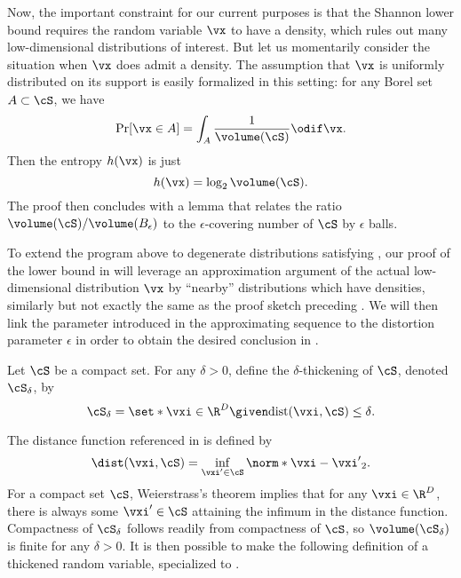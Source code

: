 \documentclass[../../book-main.tex]{subfiles}
\begin{document}
Now, the important constraint for our current purposes is that the Shannon lower
bound requires the random variable $\vx$ to have a density, which rules out many
low-dimensional distributions of interest.
But let us momentarily consider the situation when $\vx$ does admit a density.
The assumption that $\vx$ is uniformly distributed on its support is easily
formalized in this setting: for any Borel set $A \subset \cS$, we have
\begin{equation}
    \Pr[\vx \in A] = \int_{A} \frac{1}{\volume(\cS)} \odif \vx.
\end{equation}
Then the entropy $h(\vx)$ is just
\begin{equation}
    h(\vx) = \log_2 \volume(\cS).
\end{equation}
The proof then concludes with a lemma that relates the ratio $\volume(\cS)
/ \volume(B_{\epsilon})$ to the $\epsilon$-covering number of $\cS$ by
$\epsilon$ balls.


To extend the program above to degenerate distributions satisfying
,
our proof of the lower bound in  will
leverage an approximation argument of the actual low-dimensional
distribution $\vx$ by ``nearby'' distributions which have
densities, similarly but not exactly the same as the proof sketch preceding .
We will then link the parameter introduced in
the approximating sequence to the distortion parameter $\epsilon$ in order to
obtain the desired conclusion in .


\begin{definition}\label{def:thickening-set}
    Let $\cS$ be a compact set.
    For any $\delta > 0$, define the $\delta$-thickening of $\cS$, denoted
    $\cS_{\delta}$, by
    \begin{equation}
        \cS_{\delta} = \set*{\vxi \in \R^D \given \mathrm{dist}(\vxi, \cS) \leq
        \delta}.
    \end{equation}
\end{definition}
The distance function referenced in  is defined by
\begin{equation}\label{eq:dist-func}
    \dist(\vxi, \cS) = \inf_{\vxi' \in \cS} \norm*{\vxi - \vxi'}_2.
\end{equation}
For a compact set $\cS$, Weierstrass's theorem implies that for any $\vxi \in
\R^D$, there is always some $\vxi' \in \cS$ attaining the infimum in the distance
function. 
Compactness of $\cS_{\delta}$ follows readily from compactness of $\cS$, so
$\volume(\cS_{\delta})$ is finite for any $\delta > 0$. It is then possible to
make the following definition of a thickened random variable, specialized to
.
\end{document}
